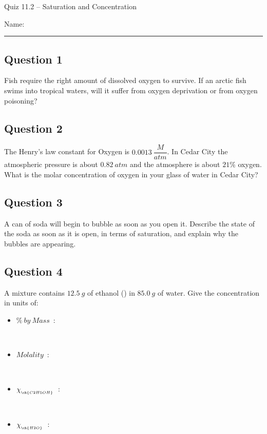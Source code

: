 \documentclass[11pt, letterpaper]{memoir}
\begin{document}
	\begin{center}
		{\large	Quiz 11.2 -- Saturation and Concentration}
	\end{center}
	{\large Name: \rule[-1mm]{4in}{.1pt} 
	
	\subsection*{Question 1}
	Fish require the right amount of dissolved oxygen to survive. If an arctic fish swims into tropical waters, will it suffer from oxygen deprivation or from oxygen poisoning?
	
	\vspace{2em}
	\subsection*{Question 2}
	The Henry's law constant for Oxygen is $0.0013~\dfrac{M}{atm}$. In Cedar City the atmospheric pressure is about $0.82~atm$ and the atmosphere is about $21\%$ oxygen. What is the molar concentration of oxygen in your glass of water in Cedar City?

	\vspace{2em}
	\subsection*{Question 3}
	A can of soda will begin to bubble as soon as you open it. Describe the state of the soda as soon as it is open, in terms of saturation, and explain why the bubbles are appearing.
	
	\vspace{4em}
	\subsection*{Question 4}
	A mixture contains $12.5~g$ of ethanol () in $85.0~g$ of water. Give the concentration in units of:
	\begin{itemize}
		\item $\%~by~Mass$~:
		
      \vspace{2em}~
		\item $Molality$~:
		
      \vspace{2em}~
		\item $\chi_{_{\ch{C2H5OH}}}$~:
		
      \vspace{2em}~
		\item $\chi_{_{\ch{H2O}}}$~:
	\end{itemize}

}
\end{document}
